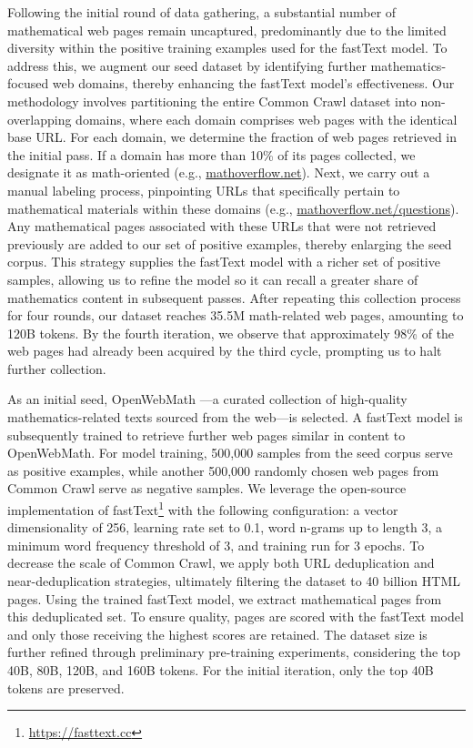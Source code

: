 Following the initial round of data gathering, a substantial number of mathematical web pages remain uncaptured, predominantly due to the limited diversity within the positive training examples used for the fastText model. To address this, we augment our seed dataset by identifying further mathematics-focused web domains, thereby enhancing the fastText model's effectiveness. Our methodology involves partitioning the entire Common Crawl dataset into non-overlapping domains, where each domain comprises web pages with the identical base URL. For each domain, we determine the fraction of web pages retrieved in the initial pass. If a domain has more than 10\% of its pages collected, we designate it as math-oriented (e.g., \url{mathoverflow.net}).
Next, we carry out a manual labeling process, pinpointing URLs that specifically pertain to mathematical materials within these domains (e.g., \url{mathoverflow.net/questions}). Any mathematical pages associated with these URLs that were not retrieved previously are added to our set of positive examples, thereby enlarging the seed corpus. This strategy supplies the fastText model with a richer set of positive samples, allowing us to refine the model so it can recall a greater share of mathematics content in subsequent passes. After repeating this collection process for four rounds, our dataset reaches 35.5M math-related web pages, amounting to 120B tokens. By the fourth iteration, we observe that approximately 98\% of the web pages had already been acquired by the third cycle, prompting us to halt further collection.

As an initial seed, OpenWebMath \citep{openwebmath}—a curated collection of high-quality mathematics-related texts sourced from the web—is selected. A fastText model \citep{joulin2016fasttext} is subsequently trained to retrieve further web pages similar in content to OpenWebMath. For model training, 500,000 samples from the seed corpus serve as positive examples, while another 500,000 randomly chosen web pages from Common Crawl serve as negative samples. We leverage the open-source implementation of fastText\footnote{\url{https://fasttext.cc}} with the following configuration: a vector dimensionality of 256, learning rate set to 0.1, word n-grams up to length 3, a minimum word frequency threshold of 3, and training run for 3 epochs. To decrease the scale of Common Crawl, we apply both URL deduplication and near-deduplication strategies, ultimately filtering the dataset to 40 billion HTML pages. Using the trained fastText model, we extract mathematical pages from this deduplicated set. To ensure quality, pages are scored with the fastText model and only those receiving the highest scores are retained. The dataset size is further refined through preliminary pre-training experiments, considering the top 40B, 80B, 120B, and 160B tokens. For the initial iteration, only the top 40B tokens are preserved.

